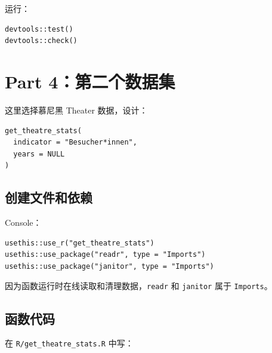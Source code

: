 \documentclass[11pt,a4paper]{ctexart}
\begin{document}
运行：

\begin{lstlisting}
devtools::test()
devtools::check()
\end{lstlisting}

\section{Part 4：第二个数据集}

这里选择慕尼黑 Theater 数据，设计：

\begin{lstlisting}
get_theatre_stats(
  indicator = "Besucher*innen",
  years = NULL
)
\end{lstlisting}

\subsection{创建文件和依赖}

Console：

\begin{lstlisting}
usethis::use_r("get_theatre_stats")
usethis::use_package("readr", type = "Imports")
usethis::use_package("janitor", type = "Imports")
\end{lstlisting}

因为函数运行时在线读取和清理数据，\texttt{readr} 和 \texttt{janitor} 属于 \texttt{Imports}。

\subsection{函数代码}

在 \texttt{R/get\_theatre\_stats.R} 中写：
\end{document}
